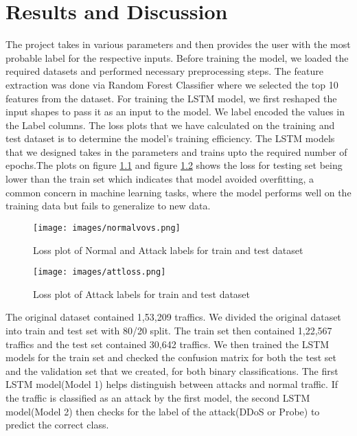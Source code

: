 \chapter{Results and Discussion}
\vspace{-18pt}
The project takes in various parameters and then provides the user with the most probable label for the respective inputs. Before training the model, we loaded the required datasets and performed necessary preprocessing steps. The feature extraction was done via Random Forest Classifier where we selected the top 10 features from the dataset. For training the LSTM model, we first reshaped the input shapes to pass it as an input to the model. We label encoded the values in the Label columns. The loss plots that we have calculated on the training and test dataset is to determine the model's training efficiency. The LSTM models that we designed takes in the parameters and trains upto the required number of epochs.The plots on figure \ref{Loss plot of Normal and Attack labels for train and test dataset} and figure \ref{Loss plot of Attack labels for train and test dataset} shows the loss for testing set being lower than the train set which indicates that model avoided overfitting, a common concern in machine learning tasks, where the model performs well on the training data but fails to generalize to new data.\par 
\begin{figure}[tbh]
	\begin{center}
		\texttt{[image: images/normalvovs.png]} 
		\caption{Loss plot of Normal and Attack labels for train and test dataset} %
		\label{Loss plot of Normal and Attack labels for train and test dataset} %
	\end{center}
\end{figure}
\begin{figure}[tbh]
	\begin{center}
		\texttt{[image: images/attloss.png]} 
		\caption{Loss plot of Attack labels for train and test dataset} %
		\label{Loss plot of Attack labels for train and test dataset} %
	\end{center}
\end{figure}
The original dataset contained 1,53,209 traffics. We divided the original dataset into train and test set with 80/20 split. The train set then contained 1,22,567 traffics and the test set contained 30,642 traffics.  We then trained the LSTM models for the train set and checked the confusion matrix for both the test set and the validation set that we created, for both binary classifications. The first LSTM model(Model 1) helps distinguish between attacks and normal traffic. If the traffic is classified as an attack by the first model, the second LSTM model(Model 2) then checks for the label of the attack(DDoS or Probe) to predict the correct class.\par
